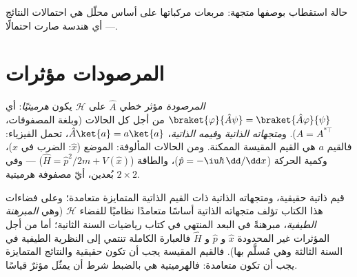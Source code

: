 \begin{omfigure}

{\small حالة استقطاب بوصفها متجهة: مربعات مركباتها على
أساس محلّل هي احتمالات النتائج --- أي هندسة صارت
احتمالًا.}
\end{omfigure}

\section{المرصودات مؤثرات}

\begin{definition}[المرصودات]\label{def:b3:quantum-formalism:observable}
\emph{المرصودة} مؤثر خطي $\hat A$ على $\mathcal H$
يكون \emph{هرميتيًا}: أي $\braket{\varphi}{\hat A\psi} =
\braket{\hat A\varphi}{\psi}$ من أجل كل الحالات (وبلغة المصفوفات،
$A = A^{*\top}$). و\emph{متجهاته الذاتية} و\emph{قيمه الذاتية}،
$\hat A\ket{a} = a\ket{a}$، تحمل الفيزياء: فالقيم $a$ هي
القيم المقيسة الممكنة. ومن الحالات المألوفة: الموضع ($\hat x$:
الضرب في $x$)، وكمية الحركة ($\hat p = -\iu\hbar\,\dd/\dd x$)،
والطاقة ($\hat H = \hat p^2/2m + V(\hat x)$) --- وفي بُعدين،
أيّ مصفوفة هرميتية $2\times2$.
\end{definition}

\begin{theorem}\label{thm:b3:quantum-formalism:hermitian}
 قيم ذاتية حقيقية، ومتجهاته الذاتية ذات
القيم الذاتية المتمايزة متعامدة؛ وعلى فضاءات هذا الكتاب تؤلف
متجهاته الذاتية أساسًا متعامدًا نظاميًا للفضاء $\mathcal H$ (وهي
\emph{المبرهنة الطيفية}، مبرهنةً في البعد المنتهي في كتاب رياضيات
السنة الثانية؛ أما من أجل المؤثرات غير المحدودة $\hat x$ و $\hat p$ و
$\hat H$ فالعبارة الكاملة تنتمي إلى النظرية الطيفية في السنة الثالثة وهي
مُسلَّم بها). فالقيم المقيسة يجب أن تكون حقيقية والنتائج المتمايزة
يجب أن تكون متعامدة: فالهرميتية هي بالضبط شرط أن يمثّل
مؤثرٌ قياسًا.
\end{theorem}

